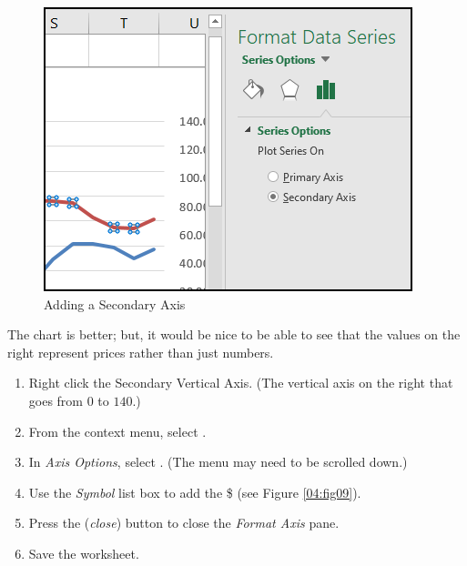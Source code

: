 \begin{figure}[H]
	\centering
	\includegraphics[width=\maxwidth{.75\linewidth}]{gfx/ch04_fig08}
	\caption{Adding a Secondary Axis}
	\label{04:fig08}
\end{figure}

The chart is better; but, it would be nice to be able to see that the values on the right represent prices rather than just numbers.

\begin{enumerate}
	\item Right click the Secondary Vertical Axis. (The vertical axis on the right that goes from $ 0 $ to $ 140 $.)
	\item From the context menu, select .
	\item In \textit{Axis Options}, select . (The menu may need to be scrolled down.)
	\item Use the \textit{Symbol} list box to add the \$ (see Figure \ref{04:fig09}).
	\item Press the  (\textit{close}) button to close the \textit{Format Axis} pane.
	\item Save the  worksheet.
\end{enumerate}


